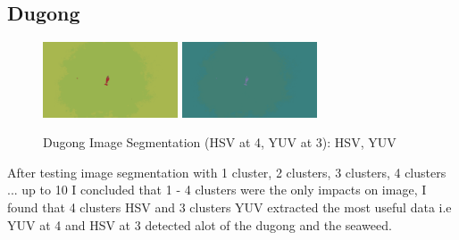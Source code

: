 \documentclass[conference]{IEEEtran}
\begin{document}
\subsection{Dugong}
\begin{figure}[htbp]
    \centerline{
        {\includegraphics[width=40mm, scale=0.5]{./figures/task 4/dugong/4 clusters HSV.png}}
        {\includegraphics[width=40mm, scale=0.5]{./figures/task 4/dugong/3 clusters YUV.png}}
    }
    \caption{Dugong Image Segmentation (HSV at 4, YUV at 3): HSV, YUV}
    \label{fig}
\end{figure}
After testing image segmentation with 1 cluster, 2 clusters, 3 clusters, 4 clusters ... up to 10 I concluded that 1 - 4 clusters were
the only impacts on image, I found that 4 clusters HSV and 3 clusters YUV extracted the most useful data i.e YUV at 4 and HSV at 3 detected alot of the dugong
and the seaweed.
\end{document}
